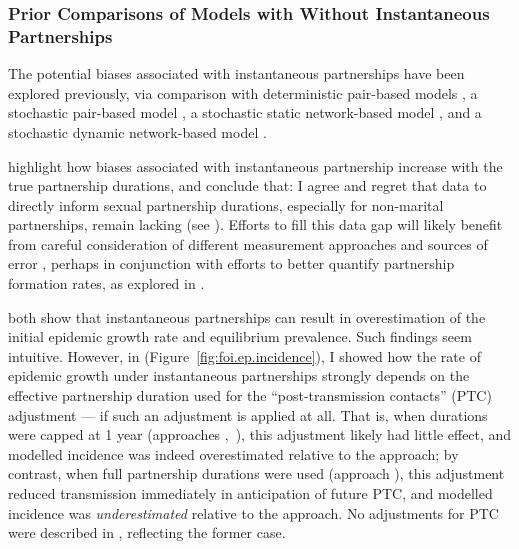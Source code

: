 \subsubsection{Prior Comparisons of Models with \vs Without Instantaneous Partnerships}\label{foi.disc.bip.prior}
The potential biases associated with instantaneous partnerships
have been explored previously, via comparison with
deterministic pair-based models \cite{Kretzschmar1998,Eames2002,Lloyd-Smith2004},
a stochastic pair-based model \cite{Eames2002},
a stochastic static network-based model \cite{Eames2002}, and
a stochastic dynamic network-based model \cite{Johnson2016mf}.
\par
\citet{Kretzschmar1998} highlight how biases associated with instantaneous partnership
increase with the true partnership durations,
and conclude that: 
I agree and regret that data to directly inform sexual partnership durations,
especially for non-marital partnerships, remain lacking (see ).
Efforts to fill this data gap will likely benefit from careful consideration of
different measurement approaches and sources of error \cite{Burington2010},
perhaps in conjunction with efforts to better quantify partnership formation rates,
as explored in .
\par
\citet{Eames2002,Lloyd-Smith2004} both show that instantaneous partnerships
can result in overestimation of the initial epidemic growth rate and equilibrium prevalence.
Such findings seem intuitive.
However, in  (Figure~\ref{fig:foi.ep.incidence}),
I showed how the rate of epidemic growth under instantaneous partnerships strongly depends
on the effective partnership duration used for the ``post-transmission contacts'' (PTC) adjustment
--- if such an adjustment is applied at all.
That is, when durations were capped at 1 year (approaches \iry,~\ipy),
this adjustment likely had little effect,
and modelled incidence was indeed overestimated relative to the \epa approach;
by contrast, when full partnership durations were used (approach \ird),
this adjustment reduced transmission immediately in anticipation of future PTC,
and modelled incidence was \emph{underestimated} relative to the \epa approach.
No adjustments for PTC were described in \cite{Eames2002,Lloyd-Smith2004},
reflecting the former case.
